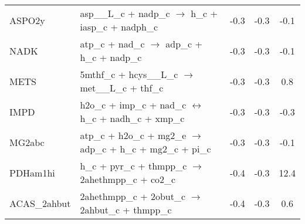 \begin{longtable}{lp{}ccc}
ASPO2y	&	asp\_\_L\_c + nadp\_c $\rightarrow$ h\_c + iasp\_c + nadph\_c	&	-0.3	&	-0.3	&	-0.1	\\
NADK	&	atp\_c + nad\_c $\rightarrow$ adp\_c + h\_c + nadp\_c	&	-0.3	&	-0.3	&	-0.1	\\
METS	&	5mthf\_c + hcys\_\_L\_c $\rightarrow$ met\_\_L\_c + thf\_c	&	-0.3	&	-0.3	&	0.8	\\
IMPD	&	h2o\_c + imp\_c + nad\_c $\leftrightarrow$ h\_c + nadh\_c + xmp\_c	&	-0.3	&	-0.3	&	-0.3	\\
MG2abc	&	atp\_c + h2o\_c + mg2\_e $\rightarrow$ adp\_c + h\_c + mg2\_c + pi\_c	&	-0.3	&	-0.3	&	-0.1	\\
PDHam1hi	&	h\_c + pyr\_c + thmpp\_c $\rightarrow$ 2ahethmpp\_c + co2\_c	&	-0.4	&	-0.3	&	12.4	\\
ACAS\_2ahbut	&	2ahethmpp\_c + 2obut\_c $\rightarrow$ 2ahbut\_c + thmpp\_c	&	-0.4	&	-0.3	&	0.6	\\

\end{longtable}
